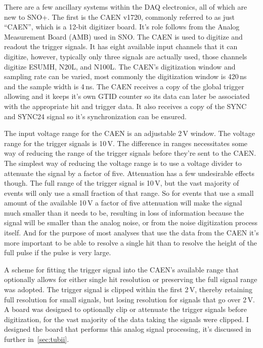 There are a few ancillary systems within the DAQ electronics, all
of which are new to SNO+.
The first is the CAEN v1720, commonly
referred to as just ``CAEN'', which is a 12-bit digitizer board.
It's role follows from the Analog Measurement Board (AMB) used in
SNO.
The CAEN is used to digitize and readout the trigger signals.
It has eight available input channels that it can digitize, however,
typically only three signals are actually used, those channels digitize ESUMH, N20L, and
N100L. The CAEN's digitization window and sampling rate can be varied,
most commonly the digitization window is 420\,ns and the sample width
is 4\,ns. The CAEN receives a copy of the global trigger allowing and
it keeps it's own GTID counter so its data can later be associated
with the appropriate hit and trigger data. It also receives a copy of the
SYNC and SYNC24 signal so it's synchronization can be ensured.

The input voltage range for the CAEN is an adjustable 2\,V window.
The voltage range for the trigger signals is 10\,V.
The difference in ranges necessitates some way of reducing the range of the trigger signals
before they're sent to the CAEN\@.
The simplest way of reducing the voltage range is to use a voltage
divider to attenuate the signal by a factor of five.
Attenuation has a few undesirable effects though.
The full range of the trigger signal is 10\,V, but the vast
majority of events will only use a small fraction of that range.
So for events that use a small amount of the available 10\,V a factor
of five attenuation will make the signal much smaller than it needs to be,
resulting in loss of information because the signal will be smaller than
the analog noise, or from the noise digitization process itself.
And for the purpose of most analyses that use the data from the CAEN
it's more important to be able to resolve a single hit than to resolve
the height of the full pulse if the pulse is very large.

A scheme for fitting the trigger signal into the CAEN's available range that
optionally allows for either single hit resolution or preserving the full
signal range was adopted.
The trigger signal is clipped within the first 2\,V, thereby retaining full
resolution for small signals, but losing resolution for signals that go over
2\,V.
A board was designed to optionally clip or attenuate the trigger signals
before digitization, for the vast majority of the data taking the signals
were clipped.
I designed the board that performs this analog signal processing,
it's discussed in further in~\ref{sec:tubii}.


